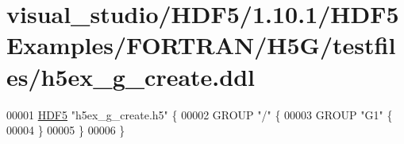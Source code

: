 \hypertarget{visual__studio_2_h_d_f5_21_810_81_2_h_d_f5_examples_2_f_o_r_t_r_a_n_2_h5_g_2testfiles_2h5ex__g__create_8ddl_source}{}\section{visual\+\_\+studio/\+H\+D\+F5/1.10.1/\+H\+D\+F5\+Examples/\+F\+O\+R\+T\+R\+A\+N/\+H5\+G/testfiles/h5ex\+\_\+g\+\_\+create.ddl}
\label{visual__studio_2_h_d_f5_21_810_81_2_h_d_f5_examples_2_f_o_r_t_r_a_n_2_h5_g_2testfiles_2h5ex__g__create_8ddl_source}

\begin{DoxyCode}
00001 \hyperlink{namespace_h_d_f5}{HDF5} \textcolor{stringliteral}{"h5ex\_g\_create.h5"} \{
00002 GROUP \textcolor{stringliteral}{"/"} \{
00003    GROUP \textcolor{stringliteral}{"G1"} \{
00004    \}
00005 \}
00006 \}
\end{DoxyCode}
